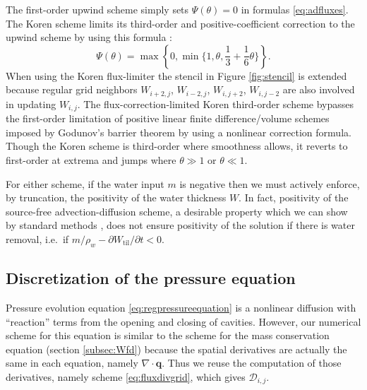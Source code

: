 \documentclass[gmd]{copernicus}   %
\newcommand{\text}{\textrm}
\newcommand\bq{\mathbf{q}}
\newcommand{\Div}{\nabla\cdot}
\newcommand{\Wtil}{W_{\text{til}}}
\begin{document}
The first-order upwind scheme simply sets $\Psi(\theta)=0$ in formulas \eqref{eq:adfluxes}.  The Koren scheme limits its third-order and positive-coefficient correction to the upwind scheme by using this formula \citep{HundsdorferVerwer2010}:
\begin{equation}
\Psi(\theta) = \max\left\{0,\min\Big\{1,\theta,\frac{1}{3}+\frac{1}{6} \theta\Big\}\right\}.  \label{eq:korenPsi}
\end{equation}
When using the Koren flux-limiter the stencil in Figure \ref{fig:stencil} is extended because regular grid neighbors $W_{i+2,j}$, $W_{i-2,j}$, $W_{i,j+2}$, $W_{i,j-2}$ are also involved in updating $W_{i,j}$.  The flux-correction-limited Koren third-order scheme bypasses the first-order limitation of positive linear finite difference/volume schemes imposed by Godunov's barrier theorem \citep[section I.7.1]{HundsdorferVerwer2010} by using a nonlinear correction formula.  Though the Koren scheme is third-order where smoothness allows, it reverts to first-order at extrema and jumps where $\theta \gg 1$ or $\theta \ll 1$.

For either scheme, if the water input $m$ is negative then we must actively enforce, by truncation, the positivity of the water thickness $W$.  In fact, positivity of the source-free advection-diffusion scheme, a desirable property which we can show by standard methods \citep{HundsdorferVerwer2010}, does not ensure positivity of the solution if there is  water removal, i.e.~if $m/\rho_w - \partial \Wtil/\partial t < 0$.

\subsection{Discretization of the pressure equation}  \label{subsec:Pfd}  Pressure evolution equation \eqref{eq:regpressureequation} is a nonlinear diffusion with ``reaction'' terms from the opening and closing of cavities.  However, our numerical scheme for this equation is similar to the scheme for the mass conservation equation (section \ref{subsec:Wfd}) because the spatial derivatives are actually the same in each equation, namely $\Div\bq$.  Thus we reuse the computation of those derivatives, namely scheme \eqref{eq:fluxdivgrid}, which gives $\mathcal{D}_{i,j}$.
\end{document}
